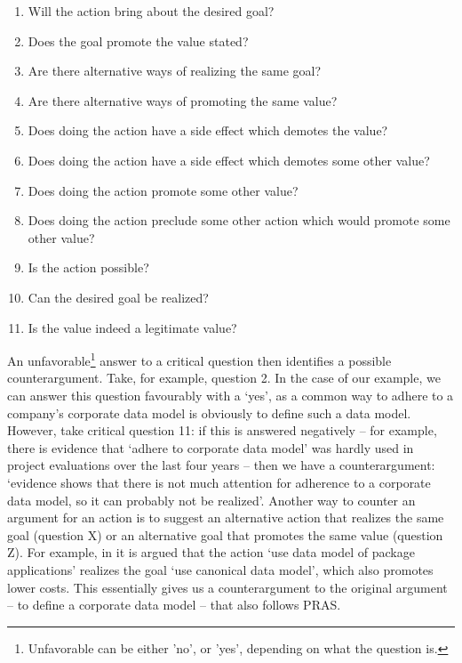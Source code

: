 \begin{enumerate}
\item Will the action bring about the desired goal?
\item Does the goal promote the value stated?
\item Are there alternative ways of realizing the same goal?
\item Are there alternative ways of promoting the same value?
\item Does doing the action have a side effect which demotes the value?
\item Does doing the action have a side effect which demotes some other value?
\item Does doing the action promote some other value?
\item Does doing the action preclude some other action which would promote some other value?
\item Is the action possible?
\item Can the desired goal be realized?
\item Is the value indeed a legitimate value?
\end{enumerate}

An unfavorable\footnote{Unfavorable can be either 'no', or 'yes', depending on what the question is.} answer to a critical question then identifies a possible counterargument. Take, for example, question 2. In the case of our example, we can answer this question favourably with a `yes', as a common way to adhere to a company's corporate data model is obviously to define such a data model. However, take critical question 11: if this is answered negatively -- for example, there is evidence that `adhere to corporate data model' was hardly used in project evaluations over the last four years \cite{vanZee-etal:er2016} -- then we have a counterargument: `evidence shows that there is not much attention for adherence to a corporate data model, so it can probably not be realized'. Another way to counter an argument for an action is to suggest an alternative action that realizes the same goal (question X) or an alternative goal that promotes the same value (question Z). For example, in \cite{vanZee-etal:er2016} it is argued that the action `use data model of package applications' realizes the goal `use canonical data model', which also promotes lower costs. This essentially gives us a counterargument to the original argument -- to define a corporate data model -- that also follows PRAS. 

